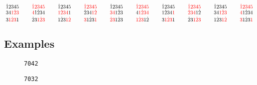 \documentclass{article}
\begin{document}
\[
\SeqCompare{\dot{1}2345}{\SeqCompare{34\textcolor{red}{1}\textcolor{red}{\dot{2}}\textcolor{red}{3}}{3\textcolor{red}{1}\textcolor{red}{\dot{2}}\textcolor{red}{3}1}}
\qquad
\SeqCompare{\textcolor{red}{\dot{1}}\textcolor{red}{2}\textcolor{red}{3}\textcolor{red}{4}\textcolor{red}{5}}{\SeqCompare{\textcolor{red}{4}1\dot{2}34}{\dot{2}3\textcolor{red}{1}\textcolor{red}{\dot{2}}\textcolor{red}{3}}}
\qquad
\SeqCompare{\dot{1}2345}{\SeqCompare{\textcolor{red}{1}\textcolor{red}{\dot{2}}\textcolor{red}{3}\textcolor{red}{4}1}{1\dot{2}3\textcolor{red}{1}\textcolor{red}{\dot{2}}}}
\qquad
\SeqCompare{\textcolor{red}{\dot{1}}\textcolor{red}{2}\textcolor{red}{3}\textcolor{red}{4}\textcolor{red}{5}}{\SeqCompare{\dot{2}34\textcolor{red}{1}\textcolor{red}{\dot{2}}}{\textcolor{red}{3}1\dot{2}3\textcolor{red}{1}}}
\qquad
\SeqCompare{\dot{1}2345}{\SeqCompare{\textcolor{red}{3}\textcolor{red}{4}1\dot{2}3}{\textcolor{red}{\dot{2}}\textcolor{red}{3}1\dot{2}3}}
\qquad
\SeqCompare{\textcolor{red}{\dot{1}}\textcolor{red}{2}\textcolor{red}{3}\textcolor{red}{4}\textcolor{red}{5}}{\SeqCompare{4\textcolor{red}{1}\textcolor{red}{\dot{2}}\textcolor{red}{3}\textcolor{red}{4}}{\textcolor{red}{1}\textcolor{red}{\dot{2}}\textcolor{red}{3}1\dot{2}}}
\qquad
\SeqCompare{\dot{1}2345}{\SeqCompare{1\dot{2}34\textcolor{red}{1}}{3\textcolor{red}{1}\textcolor{red}{\dot{2}}\textcolor{red}{3}1}}
\qquad
\SeqCompare{\textcolor{red}{\dot{1}}\textcolor{red}{2}\textcolor{red}{3}\textcolor{red}{4}\textcolor{red}{5}}{\SeqCompare{\textcolor{red}{\dot{2}}\textcolor{red}{3}\textcolor{red}{4}1\dot{2}}{\dot{2}3\textcolor{red}{1}\textcolor{red}{\dot{2}}\textcolor{red}{3}}}
\qquad
\SeqCompare{\dot{1}2345}{\SeqCompare{34\textcolor{red}{1}\textcolor{red}{\dot{2}}\textcolor{red}{3}}{1\dot{2}3\textcolor{red}{1}\textcolor{red}{\dot{2}}}}
\qquad
\SeqCompare{\textcolor{red}{\dot{1}}\textcolor{red}{2}\textcolor{red}{3}\textcolor{red}{4}\textcolor{red}{5}}{\SeqCompare{\textcolor{red}{4}1\dot{2}34}{\textcolor{red}{3}1\dot{2}3\textcolor{red}{1}}}
\]

% 
% 

\clearpage

\subsection{Examples}
\begin{figure}[h]

\caption{\texttt{7042}}
\end{figure}

\begin{figure}[h]

\caption{\texttt{7032}}
\end{figure}
\end{document}
